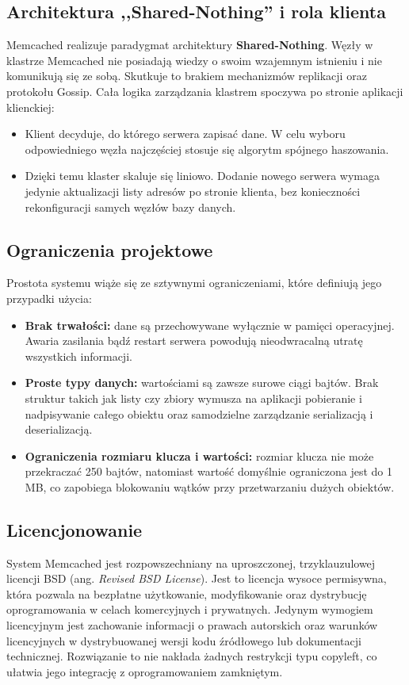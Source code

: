 \subsection{Architektura ,,Shared-Nothing'' i rola klienta}
Memcached realizuje paradygmat architektury \textbf{Shared-Nothing}. Węzły w klastrze Memcached nie posiadają wiedzy o swoim wzajemnym istnieniu i nie komunikują się ze sobą. Skutkuje to brakiem mechanizmów replikacji oraz protokołu Gossip. Cała logika zarządzania klastrem spoczywa po stronie aplikacji klienckiej:
\begin{itemize}
    \item Klient decyduje, do którego serwera zapisać dane. W celu wyboru odpowiedniego węzła najczęściej stosuje się algorytm spójnego haszowania.
    \item Dzięki temu klaster skaluje się liniowo. Dodanie nowego serwera wymaga jedynie aktualizacji listy adresów po stronie klienta, bez konieczności rekonfiguracji samych węzłów bazy danych.
\end{itemize}
\subsection{Ograniczenia projektowe}
Prostota systemu wiąże się ze sztywnymi ograniczeniami, które definiują jego przypadki użycia:
\begin{itemize}
    \item \textbf{Brak trwałości:} dane są przechowywane wyłącznie w pamięci operacyjnej. Awaria zasilania bądź restart serwera powodują nieodwracalną utratę wszystkich informacji.
    \item \textbf{Proste typy danych:} wartościami są zawsze surowe ciągi bajtów. Brak struktur takich jak listy czy zbiory wymusza na aplikacji pobieranie i nadpisywanie całego obiektu oraz samodzielne zarządzanie serializacją i deserializacją.
    \item \textbf{Ograniczenia rozmiaru klucza i wartości:} rozmiar klucza nie może przekraczać 250 bajtów, natomiast wartość domyślnie ograniczona jest do 1 MB, co zapobiega blokowaniu wątków przy przetwarzaniu dużych obiektów.
\end{itemize}

\subsection{Licencjonowanie}
System Memcached jest rozpowszechniany na uproszczonej, trzyklauzulowej licencji BSD (ang. \emph{Revised BSD License}). Jest to licencja wysoce permisywna, która pozwala na bezpłatne użytkowanie, modyfikowanie oraz dystrybucję oprogramowania w celach komercyjnych i prywatnych. Jedynym wymogiem licencyjnym jest zachowanie informacji o prawach autorskich oraz warunków licencyjnych w dystrybuowanej wersji kodu źródłowego lub dokumentacji technicznej. Rozwiązanie to nie nakłada żadnych restrykcji typu copyleft, co ułatwia jego integrację z oprogramowaniem zamkniętym.

